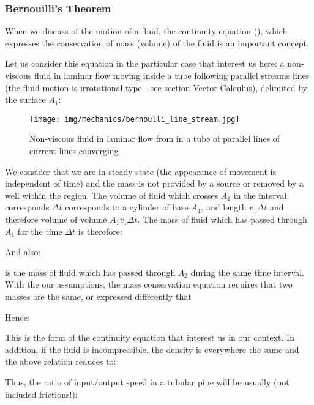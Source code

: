 	\subsubsection{Bernouilli's Theorem}
	When we discuss of the motion of a fluid, the continuity equation (), which expresses the conservation of mass (volume) of the fluid is an important concept.
	
	Let us consider this equation in the particular case that interest us here: a non-viscous fluid in laminar flow moving inside a tube following parallel streams lines (the fluid motion is irrotational type - see section Vector Calculus), delimited by the surface $A_1$:
	\begin{figure}[H]
		\centering
		\texttt{[image: img/mechanics/bernoulli\_line\_stream.jpg]}
		\caption{Non-viscous fluid in laminar flow from in a tube of parallel lines of current lines converging}
	\end{figure}
	We consider that we are in steady state (the appearance of movement is independent of time) and the mass is not provided by a source or removed by a well within the region. The volume of fluid which crosses $A_1$ in the interval corresponds $\Delta t$ corresponds to a cylinder of base $A_1$, and length $v_1\Delta t$ and therefore volume of volume $A_1v_1\Delta t$. The mass of fluid which has passed through $A_1$ for the time $\Delta t$ is therefore:
	
	And also:
	
	is the mass of fluid which has passed through $A_2$ during the same time interval. With the our assumptions, the mass conservation equation requires that two masses are the same, or expressed differently that
	
	Hence:
	
	This is the form of the continuity equation that interest us in our context. In addition, if the fluid is incompressible, the density is everywhere the same and the above relation reduces to:
	
	Thus, the ratio of input/output speed  in a tubular pipe will be usually (not included frictions!):
	
